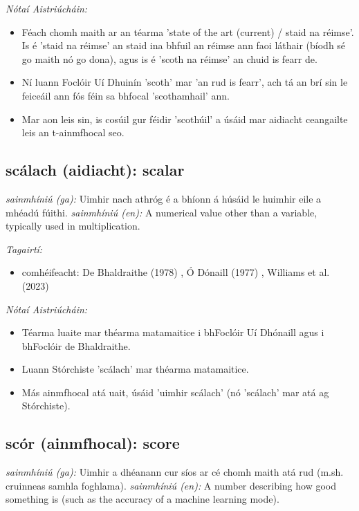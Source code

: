 \documentclass{article}
\begin{document}
 \noindent \textit{Nótaí Aistriúcháin:}
\begin{itemize}
	\item Féach chomh maith ar an téarma 'state of the art (current) / staid na réimse'. Is é 'staid na réimse' an staid ina bhfuil an réimse ann faoi láthair (bíodh sé go maith nó go dona), agus is é 'scoth na réimse' an chuid is fearr de.
	\item Ní luann Foclóir Uí Dhuinín 'scoth' mar 'an rud is fearr', ach tá an brí sin le feiceáil ann fós féin sa bhfocal 'scothamhail' ann.
	\item Mar aon leis sin, is cosúil gur féidir 'scothúil' a úsáid mar aidiacht ceangailte leis an t-ainmfhocal seo.
\end{itemize}


\subsection*{scálach (aidiacht): scalar} 
 \noindent \textit{sainmhíniú (ga):} Uimhir nach athróg é a bhíonn á húsáid le huimhir eile a mhéadú fúithi.
\newline\newline
 \noindent \textit{sainmhíniú (en):} A numerical value other than a variable, typically used in multiplication.
\newline

 \noindent \textit{Tagairtí:}
\begin{itemize}
	\item comhéifeacht: De Bhaldraithe (1978) \cite{de-bhaldraithe}, Ó Dónaill (1977) \cite{odonaill}, Williams et al. (2023) \cite{storchiste}
\end{itemize}

 \noindent \textit{Nótaí Aistriúcháin:}
\begin{itemize}
	\item Téarma luaite mar théarma matamaitice i bhFoclóir Uí Dhónaill agus i bhFoclóir de Bhaldraithe.
	\item Luann Stórchiste 'scálach' mar théarma matamaitice.
	\item Más ainmfhocal atá uait, úsáid 'uimhir scálach' (nó 'scálach' mar atá ag Stórchiste).
\end{itemize}


\subsection*{scór (ainmfhocal): score} 
 \noindent \textit{sainmhíniú (ga):} Uimhir a dhéanann cur síos ar cé chomh maith atá rud (m.sh. cruinneas samhla foghlama).
\newline\newline
 \noindent \textit{sainmhíniú (en):} A number describing how good something is (such as the accuracy of a machine learning mode).
\newline
\end{document}
